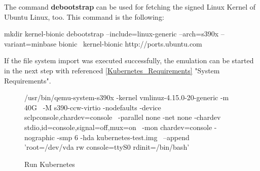 The command \textbf{debootstrap} can be used for fetching the signed Linux Kernel of Ubuntu Linux, too.
This command is the following: \\
\begin{boxedverbatim}
mkdir kernel-bionic
debootstrap --include=linux-generic --arch=s390x --variant=minbase bionic \
kernel-bionic http://ports.ubuntu.com 
\end{boxedverbatim}

If the file system import was executed successfully, the emulation can be started in the next step with referenced \ref{Kubernetes_Requirements} "System Requirements".

\begin{figure}[H]
\centering
\begin{boxedverbatim}
 /usr/bin/qemu-system-s390x -kernel vmlinuz-4.15.0-20-generic -m 40G \
 -M s390-ccw-virtio -nodefaults -device sclpconsole,chardev=console \
 -parallel none -net none -chardev stdio,id=console,signal=off,mux=on \
 -mon chardev=console -nographic -smp 6 -hda kubernetes-test.img \
 --append 'root=/dev/vda rw console=ttyS0 rdinit=/bin/bash' 
\end{boxedverbatim}
 \caption{Run Kubernetes}
    \label{RunKubernetes}
\end{figure}
